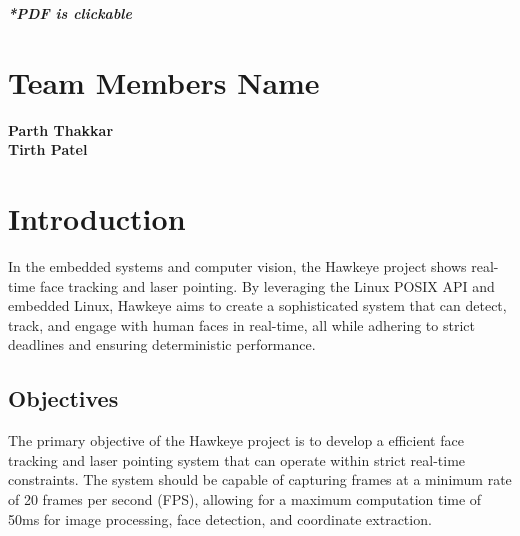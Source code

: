 \documentclass[a4paper,11pt]{article}%
\begin{document}



\pagebreak

\tableofcontents
\listoffigures
\listoftables
\vfill
\begin{center}
    \textbf{\textit{*PDF is clickable}}
\end{center}

\pagebreak

\section{Team Members Name}

\textbf{Parth Thakkar }\\[0.2cm]
\textbf{Tirth Patel }\\[0.2cm]

\pagebreak

\section{Introduction}
In the embedded systems and computer vision, the Hawkeye project shows real-time face tracking and laser pointing. By leveraging the Linux POSIX API and embedded Linux, Hawkeye aims to create a sophisticated system that can detect, track, and engage with human faces in real-time, all while adhering to strict deadlines and ensuring deterministic performance.
\subsection{Objectives}
The primary objective of the Hawkeye project is to develop a efficient face tracking and laser pointing system that can operate within strict real-time constraints. The system should be capable of capturing frames at a minimum rate of 20 frames per second (FPS), allowing for a maximum computation time of 50ms for image processing, face detection, and coordinate extraction.
\end{document}
